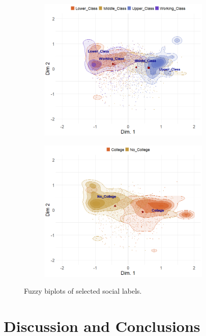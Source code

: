 \documentclass[12pt]{article}
\begin{document}
\begin{figure}[t]
     \begin{subfigure}[b]{0.49\textwidth}
        \includegraphics[trim={0cm 0cm 0cm 0cm},clip, width=0.9\textwidth]{Plots/label-proto-ex3.png}
            \caption{}
            \label{fig:label-fuzz-c}
    \end{subfigure}
     \begin{subfigure}[b]{0.49\textwidth}
        \includegraphics[trim={0cm 0cm 0cm 0cm},clip, width=0.9\textwidth]{Plots/label-proto-ex4.png}
            \caption{}
            \label{fig:label-fuzz-d}
    \end{subfigure}
    \caption{Fuzzy biplots of selected social labels.}
    \label{fig:label-fuzz}
\end{figure}

\section*{Discussion and Conclusions}

\newpage


\end{document}
